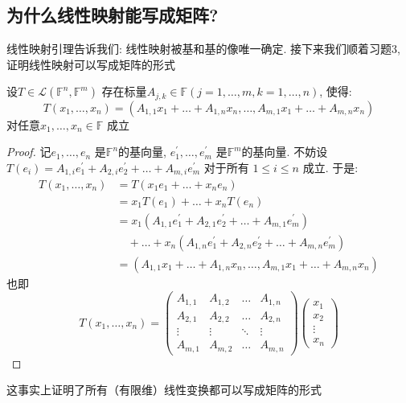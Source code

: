 \subsection{为什么线性映射能写成矩阵?}
线性映射引理告诉我们: 线性映射被基和基的像唯一确定. 接下来我们顺着习题3, 证明线性映射可以写成矩阵的形式
\begin{theorem}
    设\(T \in \mathscr{L}(\mathbb{F}^{n},\mathbb{F}^{m})\)
    存在标量\(A_{j,k} \in
    \mathbb{F} (j = 1, \dots ,m, k=1, \dots, n) \), 使得:
    \[
        T(x_{1},\dots,x_{n})=(A_{1,1}x_{1}+\dots+A_{1,n}x_{n},\dots,A_{m,1}x_{1}+\dots+A_{m,n}x_{n})
    \]
    对任意\(x_{1},\dots,x_{n} \in \mathbb{F}\) 成立
\end{theorem}

\begin{proof}
    记\(e_{1}, \dots, e_{n}\) 是\(\mathbb{F}^{n}\)的基向量,
    \(e^{\prime}_{1}, \dots, e^{\prime}_{m}\) 是\(\mathbb{F}^{m}\)的基向量.
    不妨设 \(T(e_{i}) = A_{1,i}e^{\prime}_{1} +
        A_{2,i}e^{\prime}_{2} + \dots +
    A_{m,i}e^{\prime}_{m}\) 对于所有 \(1\leq i\leq n\) 成立.
    于是:
    \begin{align*}
        T(x_{1},\dots,x_{n}) &= T(x_{1}e_{1} + \dots +
        x_{n}e_{n})\\
        &= x_{1}T(e_{1}) + \dots + x_{n}T(e_{n})\\
        &= x_{1}(A_{1,1}e^{\prime}_{1} + A_{2,1}e^{\prime}_{2} +
        \dots + A_{m,1}e^{\prime}_{m}) \nonumber \\
        &\quad + \dots +
        x_{n}(A_{1,n}e^{\prime}_{1} + A_{2,n}e^{\prime}_{2} +
        \dots + A_{m,n}e^{\prime}_{m})\\    &=
        (A_{1,1}x_{1}+\dots+A_{1,n}x_{n},\dots,A_{m,1}x_{1}+\dots+A_{m,n}x_{n})
    \end{align*}
    也即\[
        T(x_1, \dots, x_n) =
        \begin{pmatrix}
            A_{1,1} & A_{1,2} & \dots & A_{1,n} \\
            A_{2,1} & A_{2,2} & \dots & A_{2,n} \\
            \vdots  & \vdots  & \ddots & \vdots  \\
            A_{m,1} & A_{m,2} & \dots & A_{m,n}
        \end{pmatrix}
        \begin{pmatrix}
            x_1 \\
            x_2 \\
            \vdots \\
            x_n
        \end{pmatrix}
    \]
\end{proof}
这事实上证明了所有（有限维）线性变换都可以写成矩阵的形式

